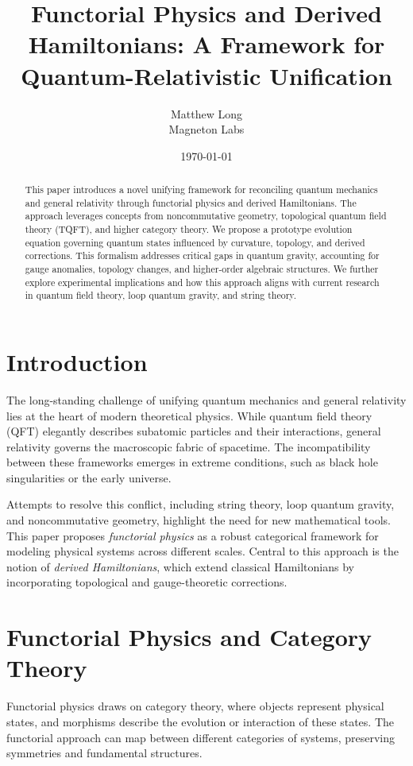 \documentclass[12pt]{article}
\title{Functorial Physics and Derived Hamiltonians: A Framework for Quantum-Relativistic Unification}
\author{Matthew Long \\ Magneton Labs}
\date{\today}
\begin{document}
\maketitle

\begin{abstract}
This paper introduces a novel unifying framework for reconciling quantum mechanics and general relativity through functorial physics and derived Hamiltonians. The approach leverages concepts from noncommutative geometry, topological quantum field theory (TQFT), and higher category theory. We propose a prototype evolution equation governing quantum states influenced by curvature, topology, and derived corrections. This formalism addresses critical gaps in quantum gravity, accounting for gauge anomalies, topology changes, and higher-order algebraic structures. We further explore experimental implications and how this approach aligns with current research in quantum field theory, loop quantum gravity, and string theory.
\end{abstract}

\tableofcontents

\section{Introduction}
The long-standing challenge of unifying quantum mechanics and general relativity lies at the heart of modern theoretical physics. While quantum field theory (QFT) elegantly describes subatomic particles and their interactions, general relativity governs the macroscopic fabric of spacetime. The incompatibility between these frameworks emerges in extreme conditions, such as black hole singularities or the early universe.

Attempts to resolve this conflict, including string theory, loop quantum gravity, and noncommutative geometry, highlight the need for new mathematical tools. This paper proposes \textit{functorial physics} as a robust categorical framework for modeling physical systems across different scales. Central to this approach is the notion of \textit{derived Hamiltonians}, which extend classical Hamiltonians by incorporating topological and gauge-theoretic corrections.

\section{Functorial Physics and Category Theory}
Functorial physics draws on category theory, where objects represent physical states, and morphisms describe the evolution or interaction of these states. The functorial approach can map between different categories of systems, preserving symmetries and fundamental structures.
\end{document}
